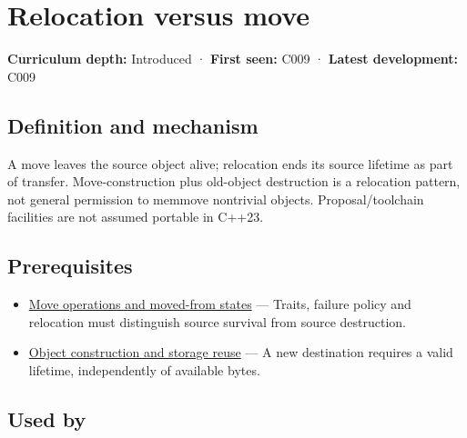 \hypertarget{appendix-adfd6397af8d}{}\label{referencestart:appendix-adfd6397af8d}
\section{Relocation versus move}\label{appendix-adfd6397af8d-relocation-versus-move}

\hypertarget{appendix-adfd6397af8d-relocation-versus-move}{}

\textbf{Curriculum depth:} Introduced · \textbf{First seen:} C009 · \textbf{Latest development:} C009

\begin{allmightroledefinition}

\subsection{Definition and mechanism}\label{appendix-adfd6397af8d-definition-and-mechanism}

\hypertarget{appendix-adfd6397af8d-definition-and-mechanism}{}

A move leaves the source object alive; relocation ends its source lifetime as part of transfer. Move-construction plus old-object destruction is a relocation pattern, not general permission to memmove nontrivial objects. Proposal/toolchain facilities are not assumed portable in C++23.

\end{allmightroledefinition}

\subsection{Prerequisites}\label{appendix-adfd6397af8d-prerequisites}

\hypertarget{appendix-adfd6397af8d-prerequisites}{}

\begin{itemize}
\tightlist
\item
  \hyperref[appendix-5636651017c2]{Move operations and moved-from states} --- Traits, failure policy and relocation must distinguish source survival from source destruction.
\item
  \hyperref[appendix-a82f9c438857]{Object construction and storage reuse} --- A new destination requires a valid lifetime, independently of available bytes.
\end{itemize}

\subsection{Used by}\label{appendix-adfd6397af8d-used-by}

